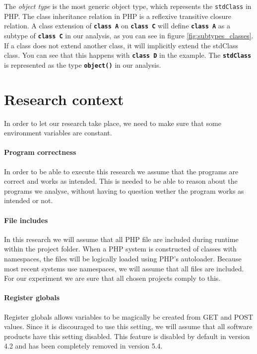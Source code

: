 \documentclass[../main.tex]{subfiles}
\begin{document}
	The \textit{object type} is the most generic object type, which represents the \texttt{stdClass} in PHP.
    The class inheritance relation in PHP is a \gls{reflexive transitive closure} relation.
    A class extension of \textbf{\texttt{class A}} on \textbf{\texttt{class C}} will define \textbf{\texttt{class A}} as a subtype of \textbf{\texttt{class C}} in our analysis, as you can see in figure \ref{fig:subtypes_classes}.
    If a class does not extend another class, it will implicitly extend the \gls{stdClass} class.
    You can see that this happens with \textbf{\texttt{class D}} in the example.
    The \textbf{\texttt{stdClass}} is represented as the type \textbf{\texttt{object()}} in our analysis.

    \section{Research context}\label{sec:implementation_context}
    In order to let our research take place, we need to make sure that some environment variables are constant.
    
    \paragraph{Program correctness}
    In order to be able to execute this research we assume that the programs are correct and works as intended.
    This is needed to be able to reason about the programs we analyse, without having to question wether the program works as intended or not.
    
    \paragraph{File includes}
    In this research we will assume that all PHP file are included during runtime within the project folder. 
    When a PHP system is constructed of classes with namespaces, the files will be logically loaded using PHP's autoloader.
    Because most recent systems use namespaces, we will assume that all files are included.
    For our experiment we are sure that all chosen projects comply to this.
    
    \paragraph{Register globals}
    Register globals allows variables to be magically be created from GET and POST values.
    Since it is discouraged to use this setting, we will assume that all software products have this setting disabled.
    This feature is disabled by default in version 4.2 and has been completely removed in version 5.4.
    
\end{document}
